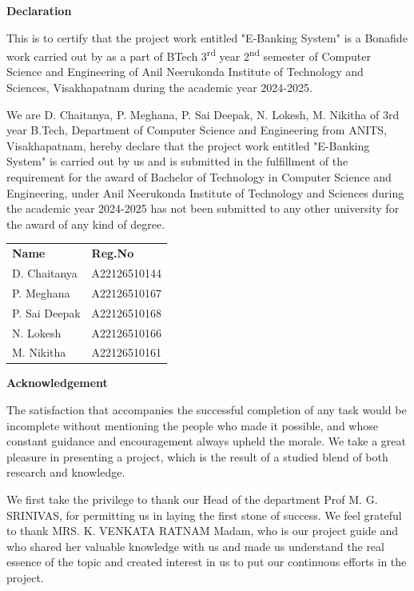\thispagestyle{empty}
\begin{center}
  {\huge\bfseries Declaration\par}
\end{center}
\vspace{1cm}

This is to certify that the project work entitled "E-Banking System" is a
Bonafide work carried out by as a part of BTech 3\textsuperscript{rd} year
2\textsuperscript{nd} semester of Computer Science and Engineering of Anil
Neerukonda Institute of Technology and Sciences, Visakhapatnam during the
academic year 2024-2025.

We are D. Chaitanya, P. Meghana, P. Sai Deepak, N. Lokesh, M. Nikitha of 3rd
year B.Tech, Department of Computer Science and Engineering from ANITS,
Visakhapatnam, hereby declare that the project work entitled "E-Banking System"
is carried out by us and is submitted in the fulfillment of the requirement for
the award of Bachelor of Technology in Computer Science and Engineering, under
Anil Neerukonda Institute of Technology and Sciences during the academic year
2024-2025 has not been submitted to any other university for the award of any
kind of degree.

\vspace{2cm}
\begin{tabular}{ll}
  \textbf{Name} & \textbf{Reg.No} \\
  D. Chaitanya & A22126510144 \\
  P. Meghana & A22126510167 \\
  P. Sai Deepak & A22126510168 \\
  N. Lokesh & A22126510166 \\
  M. Nikitha & A22126510161 \\
\end{tabular}
\newpage

\thispagestyle{empty}
\begin{center}
  {\huge\bfseries Acknowledgement\par}
\end{center}
\vspace{1cm}

The satisfaction that accompanies the successful completion of any task would
be incomplete without mentioning the people who made it possible, and whose
constant guidance and encouragement always upheld the morale. We take a great
pleasure in presenting a project, which is the result of a studied blend of
both research and knowledge.

We first take the privilege to thank our Head of the department Prof M.
G. SRINIVAS, for permitting us in laying the first stone of success. We
feel grateful to thank MRS. K. VENKATA RATNAM Madam, who is our project guide
and who shared her valuable knowledge with us and made us understand the real
essence of the topic and created interest in us to put our continuous efforts
in the project.


